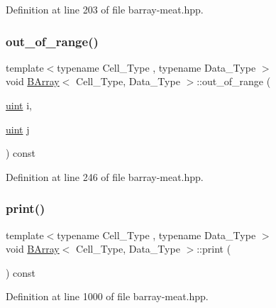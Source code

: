 Definition at line 203 of file barray-\/meat.\+hpp.

\mbox{\label{class_b_array_a87bad4dcad82009d5721d21808b7e469}} 
\subsubsection{\texorpdfstring{out\+\_\+of\+\_\+range()}{out\_of\_range()}}
{\footnotesize\ttfamily template$<$typename Cell\+\_\+\+Type , typename Data\+\_\+\+Type $>$ \\
void \hyperlink{class_b_array}{B\+Array}$<$ Cell\+\_\+\+Type, Data\+\_\+\+Type $>$\+::out\+\_\+of\+\_\+range (\begin{DoxyParamCaption}\item[{\hyperlink{typedefs_8hpp_a91ad9478d81a7aaf2593e8d9c3d06a14}{uint}}]{i,  }\item[{\hyperlink{typedefs_8hpp_a91ad9478d81a7aaf2593e8d9c3d06a14}{uint}}]{j }\end{DoxyParamCaption}) const\hspace{0.3cm}{\ttfamily [inline]}}



Definition at line 246 of file barray-\/meat.\+hpp.

\mbox{\label{class_b_array_a9d150c44b23cf1e4af45f540508db1de}} 
\subsubsection{\texorpdfstring{print()}{print()}}
{\footnotesize\ttfamily template$<$typename Cell\+\_\+\+Type , typename Data\+\_\+\+Type $>$ \\
void \hyperlink{class_b_array}{B\+Array}$<$ Cell\+\_\+\+Type, Data\+\_\+\+Type $>$\+::print (\begin{DoxyParamCaption}{ }\end{DoxyParamCaption}) const\hspace{0.3cm}{\ttfamily [inline]}}



Definition at line 1000 of file barray-\/meat.\+hpp.

\mbox{\label{class_b_array_a5eacd388e3d0f638f2c35b6e0f0c490c}} 
